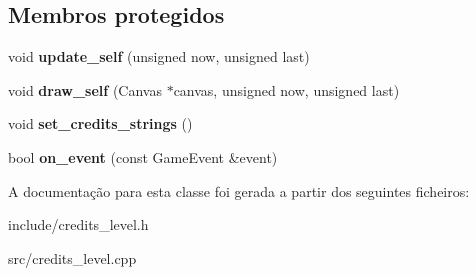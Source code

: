 \subsection*{Membros protegidos}
\begin{DoxyCompactItemize}
\item 
\mbox{\label{classCreditsLevel_a2df0795f16916cab12337010ee18f46c}} 
void {\bfseries update\+\_\+self} (unsigned now, unsigned last)
\item 
\mbox{\label{classCreditsLevel_af980e138ebbad6f73b3835f38ee4dfe6}} 
void {\bfseries draw\+\_\+self} (Canvas $\ast$canvas, unsigned now, unsigned last)
\item 
\mbox{\label{classCreditsLevel_a627849460d0ed66cfdc491fbdd313388}} 
void {\bfseries set\+\_\+credits\+\_\+strings} ()
\item 
\mbox{\label{classCreditsLevel_afa4ec08490398e3532fce7815c77aa46}} 
bool {\bfseries on\+\_\+event} (const Game\+Event \&event)
\end{DoxyCompactItemize}


A documentação para esta classe foi gerada a partir dos seguintes ficheiros\+:\begin{DoxyCompactItemize}
\item 
include/credits\+\_\+level.\+h\item 
src/credits\+\_\+level.\+cpp\end{DoxyCompactItemize}

